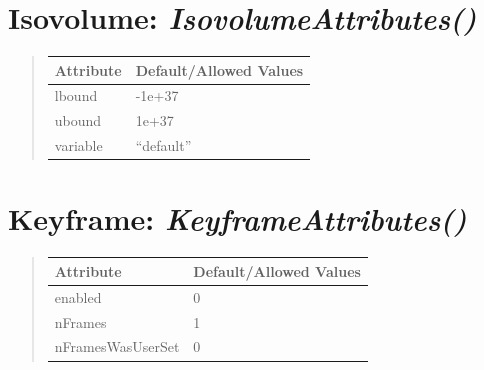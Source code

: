\documentclass[letterpaper,10pt,english]{sphinxmanual}
\begin{document}
\section{\textbf{Isovolume}: \emph{IsovolumeAttributes()}}
\label{attributes:isovolume-isovolumeattributes}
\begin{DUlineblock}{0em}
\item[] 
\end{DUlineblock}
\begin{quote}

\begin{tabulary}{\linewidth}{|L|L|}
\hline

\textbf{Attribute}
 & 
\textbf{Default/Allowed Values}
\\
\hline
lbound
 & 
-1e+37
\\
\hline
ubound
 & 
1e+37
\\
\hline
variable
 & 
``default''
\\
\hline\end{tabulary}

\end{quote}

\begin{DUlineblock}{0em}
\item[] 
\end{DUlineblock}

\begin{DUlineblock}{0em}
\item[] 
\end{DUlineblock}


\section{\textbf{Keyframe}: \emph{KeyframeAttributes()}}
\label{attributes:keyframe-keyframeattributes}
\begin{DUlineblock}{0em}
\item[] 
\end{DUlineblock}
\begin{quote}

\begin{tabulary}{\linewidth}{|L|L|}
\hline

\textbf{Attribute}
 & 
\textbf{Default/Allowed Values}
\\
\hline
enabled
 & 
0
\\
\hline
nFrames
 & 
1
\\
\hline
nFramesWasUserSet
 & 
0
\\
\hline\end{tabulary}

\end{quote}
\end{document}
